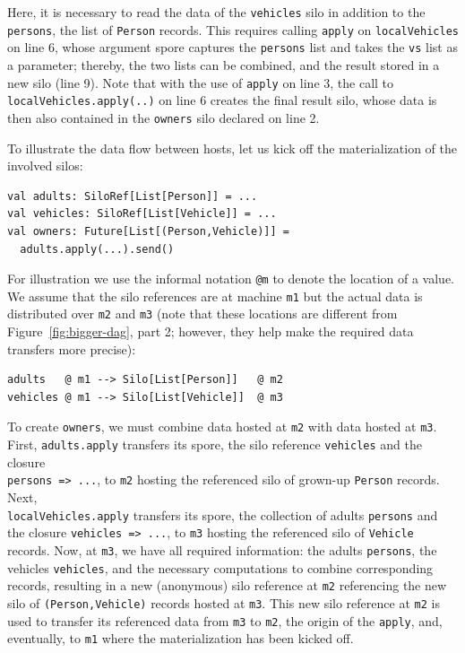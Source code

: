 \documentclass{jfp1}
\begin{document}
\noindent
Here, it is necessary to read the data of the \verb|vehicles| silo in
addition to the \verb|persons|, the list of \verb|Person|
records. This requires calling \verb|apply| on \verb|localVehicles| on
line 6, whose argument spore captures the \verb|persons| list and
takes the \verb|vs| list as a parameter; thereby, the two lists can be
combined, and the result stored in a new silo (line 9).
Note that with the use
of \verb|apply| on line 3, the call to
\verb|localVehicles.apply(..)| on line 6 creates the final result silo,
whose data is then also contained in the \verb|owners| silo declared
on line 2.

To illustrate the data flow between hosts, let us kick off the
materialization of the involved silos:
\begin{lstlisting}
val adults: SiloRef[List[Person]] = ...
val vehicles: SiloRef[List[Vehicle]] = ...
val owners: Future[List[(Person,Vehicle)]] =
  adults.apply(...).send()
\end{lstlisting}
\noindent
For illustration we use the informal notation \verb|@m| to denote the
location of a value. We assume that the silo references are at machine
\verb|m1| but the actual data is distributed over \verb|m2| and
\verb|m3| (note that these locations are different from
Figure~\ref{fig:bigger-dag}, part 2; however, they help make the
required data transfers more precise):

\begin{lstlisting}
adults   @ m1 --> Silo[List[Person]]   @ m2
vehicles @ m1 --> Silo[List[Vehicle]]  @ m3
\end{lstlisting}
\noindent
To create \verb|owners|, we must combine data hosted at \verb|m2| with
data hosted at \verb|m3|. First, \verb|adults.apply| transfers its
spore, \ie the silo reference \verb|vehicles| and the closure\\
\verb|persons => ...|, to \verb|m2| hosting the referenced silo of
grown-up \verb|Person| records. Next,\\ \verb|localVehicles.apply|
transfers its spore, \ie the collection of adults \verb|persons| and
the closure \verb|vehicles => ...|, to \verb|m3| hosting the
referenced silo of \verb|Vehicle| records. Now, at \verb|m3|, we have
all required information: the adults \verb|persons|, the vehicles
\verb|vehicles|, and the necessary computations to combine
corresponding records, resulting in a new (anonymous) silo reference
at \verb|m2| referencing the new silo of \verb|(Person,Vehicle)|
records hosted at \verb|m3|. This new silo reference at \verb|m2| is
used to transfer its referenced data from \verb|m3| to \verb|m2|, the
origin of the \verb|apply|, and, eventually, to \verb|m1| where the
materialization has been kicked off.
\end{document}
